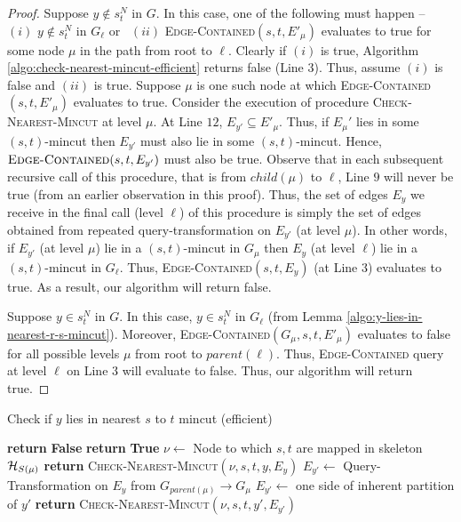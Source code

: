 \begin{proof}
Suppose $y \not \in s_t^N$ in $G$. In this case, one of the following must happen -- ~$(i)$ $y \not \in s_t^N$ in $G_\ell$ or ~$(ii)$ \textsc{Edge-Contained}$(s,t,E'_\mu)$ evaluates to true for some node $\mu$ in the path from root to $\ell$. Clearly if $(i)$ is true, Algorithm \ref{algo:check-nearest-mincut-efficient} returns false (Line $3$). Thus, assume $(i)$ is false and $(ii)$ is true. Suppose $\mu$ is one such node at which \textsc{Edge-Contained}$(s,t,E'_\mu)$ evaluates to true. Consider the execution of procedure \textsc{Check-Nearest-Mincut} at level $\mu$. At Line $12$, $E_{y'}\subseteq E'_\mu$. Thus, if $E_\mu'$ lies in some $(s,t)$-mincut then $E_{y'}$ must also lie in some $(s,t)$-mincut. Hence, $\textsc{Edge-Contained}(s,t,E_{y'})$ must also be true. Observe that in each subsequent recursive call of this procedure, that is from $child(\mu)$ to $\ell$, Line $9$ will never be true (from an earlier observation in this proof). Thus, the set of edges $E_y$ we receive in the final call (level $\ell$) of this procedure is simply the set of edges obtained from repeated query-transformation on $E_{y'}$ (at level $\mu$). In other words, if $E_{y'}$ (at level $\mu$) lie in a $(s,t)$-mincut in $G_\mu$ then $E_{y}$ (at level $\ell$) lie in a $(s,t)$-mincut in $G_\ell$. Thus, \textsc{Edge-Contained}$(s,t,E_y)$ (at Line $3$) evaluates to true. As a result, our algorithm will return false.


Suppose $y \in s_t^N$ in $G$. In this case, $y \in s_t^N$ in $G_\ell$ (from Lemma \ref{algo:y-lies-in-nearest-r-s-mincut}). Moreover, \textsc{Edge-Contained}$(G_\mu,s,t,E'_\mu)$ evaluates to false for all possible levels $\mu$ from root to $parent(\ell)$. Thus, \textsc{Edge-Contained} query at level $\ell$ on Line 3 will evaluate to false. Thus, our algorithm will return true.

\end{proof}

\begin{algorithm}%
    \caption{Check if $y$ lies in nearest $s$ to $t$ mincut (efficient)}
    \label{algo:check-nearest-mincut-efficient}
    \begin{algorithmic}[1] %
         \textbf{return} \textbf{False}
        \State \textbf{return} \textbf{True}
        \EndIf
        \State $\nu \gets$ Node to which $s,t$ are mapped in skeleton ${\cal H}_{S(\mu)}$
         \textbf{return} \textsc{Check-Nearest-Mincut}$(\nu,s,t,y,E_y)$
        \State $E_{y'} \gets$ Query-Transformation on $E_y$ from $G_{parent(\mu)}\rightarrow G_\mu$
        \State $E_{y'} \gets$ one side of inherent partition of $y'$
        \EndIf
        \State \textbf{return} \textsc{Check-Nearest-Mincut}$(\nu,s,t,y',E_{y'})$
        \EndProcedure
    \end{algorithmic}
\end{algorithm}


